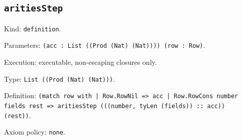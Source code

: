 \documentclass[11pt]{article}
\begin{document}
\subsection*{\texttt{aritiesStep}}
\noindent Kind: \texttt{definition}.\par
\noindent Parameters: \texttt{(acc : List ((Prod (Nat) (Nat)))) (row : Row)}.\par
\noindent Execution: executable, non-escaping closures only.\par
\noindent Type: \texttt{List ((Prod (Nat) (Nat)))}.\par
\noindent Definition: \texttt{(match row with | Row.RowNil => acc | Row.RowCons number fields rest => aritiesStep (((number, tyLen (fields)) :: acc)) (rest))}.\par
\noindent Axiom policy: \texttt{none}.\par
\end{document}
